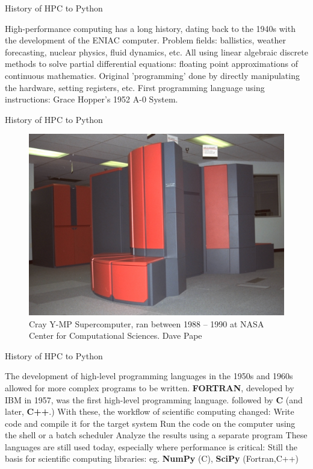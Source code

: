 \documentclass[aspectratio=169]{beamer}
\begin{document}
    \begin{frame}{History of HPC to Python}
        \begin{outline}
            \1 High-performance computing has a long history, dating back to the 1940s with the development of the ENIAC computer.
                \2 Problem fields: ballistics, weather forecasting, nuclear physics, fluid dynamics, etc. 
                \2 All using linear algebraic discrete methods to solve partial differential equations: floating point approximations of continuous mathematics.
            \1 Original 'programming' done by directly manipulating the hardware, setting registers, etc. 
                \2 First programming language using instructions: Grace Hopper's 1952 A-0 System. 
        \end{outline}
    \end{frame}

    \begin{frame}{History of HPC to Python}
        \begin{figure}[H]
            \centering
            \includegraphics[width=0.50\linewidth]{Cray.jpg}
            \caption{Cray Y-MP Supercomputer, ran between 1988 -- 1990 at NASA Center for Computational Sciences. \ccLogo Dave Pape}
        \end{figure}
    \end{frame}

    \begin{frame}{History of HPC to Python}
        \begin{outline}
            \1 The development of high-level programming languages in the 1950s and 1960s allowed for more complex programs to be written.
                \2 \textbf{FORTRAN}, developed by IBM in 1957, was the first high-level programming language.
                \2 followed by \textbf{C} (and later, \textbf{C++}.)
            \1 With these, the workflow of scientific computing changed:
                \2 Write code and compile it for the target system
                \2 Run the code on the computer using the shell or a batch scheduler
                \2 Analyze the results using a separate program
            \1 These languages are still used today, especially where performance is critical:
                \2 Still the basis for scientific computing libraries: eg. \textbf{NumPy} (C), \textbf{SciPy} (Fortran,C++)
        \end{outline}
    \end{frame}
\end{document}
